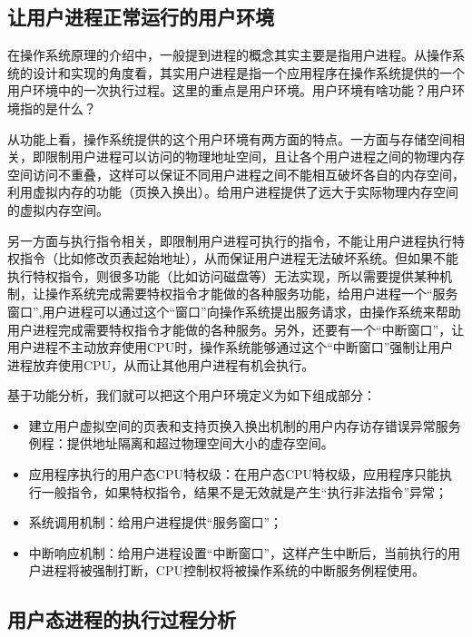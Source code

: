 \subsection{让用户进程正常运行的用户环境}\label{ux8ba9ux7528ux6237ux8fdbux7a0bux6b63ux5e38ux8fd0ux884cux7684ux7528ux6237ux73afux5883}

在操作系统原理的介绍中，一般提到进程的概念其实主要是指用户进程。从操作系统的设计和实现的角度看，其实用户进程是指一个应用程序在操作系统提供的一个用户环境中的一次执行过程。这里的重点是用户环境。用户环境有啥功能？用户环境指的是什么？

从功能上看，操作系统提供的这个用户环境有两方面的特点。一方面与存储空间相关，即限制用户进程可以访问的物理地址空间，且让各个用户进程之间的物理内存空间访问不重叠，这样可以保证不同用户进程之间不能相互破坏各自的内存空间，利用虚拟内存的功能（页换入换出）。给用户进程提供了远大于实际物理内存空间的虚拟内存空间。

另一方面与执行指令相关，即限制用户进程可执行的指令，不能让用户进程执行特权指令（比如修改页表起始地址），从而保证用户进程无法破坏系统。但如果不能执行特权指令，则很多功能（比如访问磁盘等）无法实现，所以需要提供某种机制，让操作系统完成需要特权指令才能做的各种服务功能，给用户进程一个``服务窗口'',用户进程可以通过这个``窗口''向操作系统提出服务请求，由操作系统来帮助用户进程完成需要特权指令才能做的各种服务。另外，还要有一个``中断窗口''，让用户进程不主动放弃使用CPU时，操作系统能够通过这个``中断窗口''强制让用户进程放弃使用CPU，从而让其他用户进程有机会执行。

基于功能分析，我们就可以把这个用户环境定义为如下组成部分：

\begin{itemize}
\tightlist
\item
  建立用户虚拟空间的页表和支持页换入换出机制的用户内存访存错误异常服务例程：提供地址隔离和超过物理空间大小的虚存空间。
\item
  应用程序执行的用户态CPU特权级：在用户态CPU特权级，应用程序只能执行一般指令，如果特权指令，结果不是无效就是产生``执行非法指令''异常；
\item
  系统调用机制：给用户进程提供``服务窗口''；
\item
  中断响应机制：给用户进程设置``中断窗口''，这样产生中断后，当前执行的用户进程将被强制打断，CPU控制权将被操作系统的中断服务例程使用。
\end{itemize}

\subsection{用户态进程的执行过程分析}\label{ux7528ux6237ux6001ux8fdbux7a0bux7684ux6267ux884cux8fc7ux7a0bux5206ux6790}

